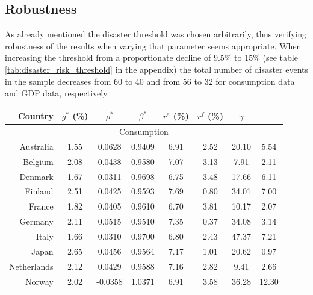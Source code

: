 {\subsection{Robustness} \label{Robustness}

As already mentioned the disaster threshold was chosen arbitrarily, thus verifying robustness of the results when varying that parameter seems appropriate. When increasing the threshold from a proportionate decline of 9.5\% to 15\% (see table \ref{tab:disaster_risk_threshold} in the appendix) the total number of disaster events in the sample decreases from 60 to 40 and from 56 to 32 for consumption data and GDP data, respectively. 

{\renewcommand{\arraystretch}{1}
\begin{table}[p]
\begin{center}
\begin{tabular}{rccccccc}
\hline
\hline
Country & $g^{*}$ (\%) & $\rho^{*}$ & $\beta^{*}$ & $r^{e}$ (\%) & $r^{f}$ (\%) & \underline{$\gamma$} & \boldsymbol{$\gamma$}\\
\hline
\multicolumn{8}{c}{Consumption}\\
\hline

Australia & 1.55 & 0.0628 & 0.9409 & 6.91 & 2.52 & 20.10 & 5.54\\ 

Belgium & 2.08 & 0.0438 & 0.9580 & 7.07 & 3.13 & 7.91 &  2.11\\ 

Denmark & 1.67 & 0.0311 & 0.9698 & 6.75 & 3.48 & 17.66 &  6.11\\ 

Finland & 2.51 & 0.0425 & 0.9593 & 7.69 & 0.80 & 34.01 &  7.00\\ 

France & 1.82 & 0.0405 & 0.9610 & 6.70 & 3.81 & 10.17 &  2.07\\ 

Germany & 2.11 & 0.0515 & 0.9510 & 7.35 & 0.37 & 34.08 &  3.14\\ 

Italy & 1.66 & 0.0310 & 0.9700 & 6.80 & 2.43 & 47.37 &  7.21\\ 

Japan & 2.65 & 0.0456 & 0.9564 & 7.17 & 1.01 & 20.62 &  0.97\\ 

Netherlands & 2.12 & 0.0429 & 0.9588 & 7.16 & 2.82 & 9.41 &  2.66\\ 

Norway & 2.02 & -0.0358 & 1.0371 & 6.91 & 3.58 & 36.28 &  12.30\\ 


\end{tabular}
\end{center}
\end{table}}}
